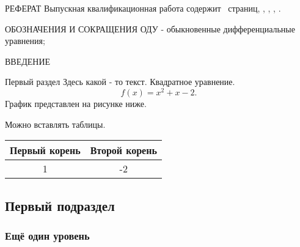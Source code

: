 \documentclass[14pt, a4paper, oneside, final]{extarticle}
\begin{document}
\begin{gostabstract}{РЕФЕРАТ}
Выпускная квалификационная работа содержит \pageref*{LastPage}~страниц, \printtotfig, \printtottab, \printtotapp, \printtotref .
\end{gostabstract}


\gosttableofcontents


\begin{lofab}{ОБОЗНАЧЕНИЯ И СОКРАЩЕНИЯ}
ОДУ - обыкновенные дифференциальные уравнения;\\
\end{lofab}


\begin{gostheader}{ВВЕДЕНИЕ}
\end{gostheader}


\mainpart


\begin{gostsection}{Первый раздел}
Здесь какой - то текст. Квадратное уравнение.
\begin{equation}
f(x) = x^2 + x-2.
\end{equation}
График представлен на рисунке ниже.
\begin{gostfigure}
\begin{center} 
\end{center}
\end{gostfigure}

Можно вставлять таблицы.
\begin{gosttable}
\begin{center} 
\begin{tabular}{|c|c|}
\hline 
Первый корень &  Второй корень \\ 
\hline 
1 & -2  \\ 
\hline 
\end{tabular} 
\end{center}
\end{gosttable}


\subsection{Первый подраздел}

\subsubsection{Ещё один уровень}

\end{gostsection}
\end{document}
